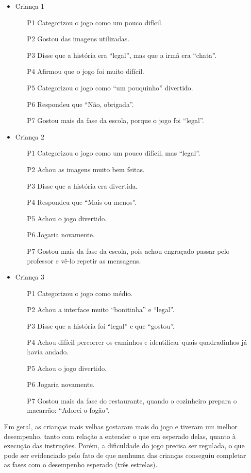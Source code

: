 \begin{itemize}
	\item Criança 1
	\begin{itemize}
		\item[P1] Categorizou o jogo como um pouco difícil.
		\item[P2] Gostou das imagens utilizadas.
		\item[P3] Disse que a história era “legal”, mas que a irmã era “chata”.
		\item[P4] Afirmou que o jogo foi muito difícil.
		\item[P5] Categorizou o jogo como “um pouquinho” divertido.
		\item[P6] Respondeu que “Não, obrigada”.
		\item[P7] Gostou mais da fase da escola, porque o jogo foi “legal”.
	\end{itemize}
	\item Criança 2
	\begin{itemize}
		\item[P1] Categorizou o jogo como um pouco difícil, mas “legal”.
		\item[P2] Achou as imagens muito bem feitas.
		\item[P3] Disse que a história era divertida.
		\item[P4] Respondeu que “Mais ou menos”.
		\item[P5] Achou o jogo divertido.
		\item[P6] Jogaria novamente.
		\item[P7] Gostou mais da fase da escola, pois achou engraçado passar pelo professor e vê-lo repetir as mensagens.
	\end{itemize}
	\item Criança 3
	\begin{itemize}
		\item[P1] Categorizou o jogo como médio.
		\item[P2] Achou a interface muito “bonitinha” e “legal”.
		\item[P3] Disse que a história foi “legal” e que “gostou”.
		\item[P4] Achou difícil percorrer os caminhos e identificar quais quadradinhos já havia andado.
		\item[P5] Achou o jogo divertido.
		\item[P6] Jogaria novamente.
		\item[P7] Gostou mais da fase do restaurante, quando o cozinheiro prepara o macarrão: “Adorei o fogão”.
	\end{itemize}
\end{itemize}

Em geral, as crianças mais velhas gostaram mais do jogo e tiveram um melhor desempenho, tanto com relação a entender o que era esperado delas, quanto à execução das instruções. Porém, a dificuldade do jogo precisa ser regulada, o que pode ser evidenciado pelo fato de que nenhuma das crianças conseguiu completar as fases com o desempenho esperado (três estrelas).
